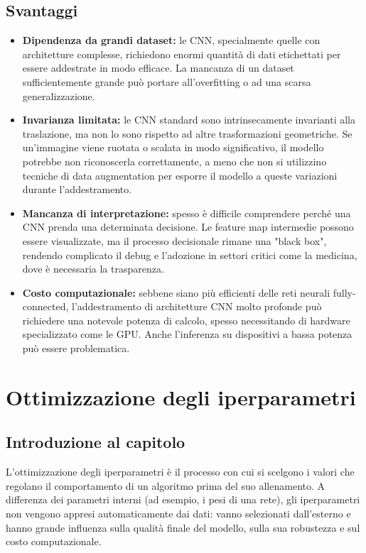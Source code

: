\documentclass[a4paper,12pt]{report}
\begin{document}
	\section{Svantaggi}
	
	\begin{itemize}
		\item \textbf{Dipendenza da grandi dataset:} le CNN, specialmente quelle con architetture complesse, richiedono enormi quantità di dati etichettati per essere addestrate in modo efficace. La mancanza di un dataset sufficientemente grande può portare all'overfitting o ad una scarsa generalizzazione.
		\item \textbf{Invarianza limitata:} le CNN standard sono intrinsecamente invarianti alla traslazione, ma non lo sono rispetto ad altre trasformazioni geometriche. Se un'immagine viene ruotata o scalata in modo significativo, il modello potrebbe non riconoscerla correttamente, a meno che non si utilizzino tecniche di data augmentation per esporre il modello a queste variazioni durante l'addestramento.
		\item \textbf{Mancanza di interpretazione:} spesso è difficile comprendere perché una CNN prenda una determinata decisione. Le feature map intermedie possono essere visualizzate, ma il processo decisionale rimane una "black box", rendendo complicato il debug e l'adozione in settori critici come la medicina, dove è necessaria la trasparenza.
		\item \textbf{Costo computazionale:} sebbene siano più efficienti delle reti neurali fully-connected, l'addestramento di architetture CNN molto profonde può richiedere una notevole potenza di calcolo, spesso necessitando di hardware specializzato come le GPU. Anche l'inferenza su dispositivi a bassa potenza può essere problematica.
	\end{itemize}
	
	\chapter{Ottimizzazione degli iperparametri}
	
	\section{Introduzione al capitolo}
	L'ottimizzazione degli iperparametri è il processo con cui si scelgono i valori che regolano il comportamento di un algoritmo prima del suo allenamento. A differenza dei parametri interni (ad esempio, i pesi di una rete), gli iperparametri non vengono appresi automaticamente dai dati: vanno selezionati dall'esterno e hanno grande influenza sulla qualità finale del modello, sulla sua robustezza e sul costo computazionale.
	
\end{document}
